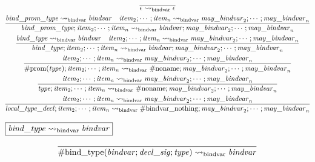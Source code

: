 \begin{gather*}
    \infer{\epsilon \rightsquigarrow_\mathrm{bindvar} \epsilon}{}
    \\
    \infer{\mathit{bind\_prom\_type}; \mathit{item}_2; \cdots; \mathit{item}_n \rightsquigarrow_\mathrm{bindvar} \mathit{bindvar}; \mathit{may\_bindvar}_2; \cdots; \mathit{may\_bindvar}_n}{
        \mathit{bind\_prom\_type} \rightsquigarrow_\mathrm{bindvar} \mathit{bindvar}
        &
        \mathit{item}_2; \cdots; \mathit{item}_n \rightsquigarrow_\mathrm{bindvar} \mathit{may\_bindvar}_2; \cdots; \mathit{may\_bindvar}_n
    }
    \\
    \infer{\mathit{bind\_type}; \mathit{item}_2; \cdots; \mathit{item}_n \rightsquigarrow_\mathrm{bindvar} \mathit{bindvar}; \mathit{may\_bindvar}_2; \cdots; \mathit{may\_bindvar}_n}{
        \mathit{bind\_type} \rightsquigarrow_\mathrm{bindvar} \mathit{bindvar}
        &
        \mathit{item}_2; \cdots; \mathit{item}_n \rightsquigarrow_\mathrm{bindvar} \mathit{may\_bindvar}_2; \cdots; \mathit{may\_bindvar}_n
    }
    \\
    \infer{\mathrm{\#prom}(\mathit{type}); \mathit{item}_2; \cdots; \mathit{item}_n \rightsquigarrow_\mathrm{bindvar} \mathrm{\#noname}; \mathit{may\_bindvar}_2; \cdots; \mathit{may\_bindvar}_n}{
        \mathit{item}_2; \cdots; \mathit{item}_n \rightsquigarrow_\mathrm{bindvar} \mathit{may\_bindvar}_2; \cdots; \mathit{may\_bindvar}_n
    }
    \\
    \infer{\mathit{type}; \mathit{item}_2; \cdots; \mathit{item}_n \rightsquigarrow_\mathrm{bindvar} \mathrm{\#noname}; \mathit{may\_bindvar}_2; \cdots; \mathit{may\_bindvar}_n}{
        \mathit{item}_2; \cdots; \mathit{item}_n \rightsquigarrow_\mathrm{bindvar} \mathit{may\_bindvar}_2; \cdots; \mathit{may\_bindvar}_n
    }
    \\
    \infer{\mathit{local\_type\_decl}; \mathit{item}_2; \cdots; \mathit{item}_n \rightsquigarrow_\mathrm{bindvar} \mathrm{\#bindvar\_nothing}; \mathit{may\_bindvar}_2; \cdots; \mathit{may\_bindvar}_n}{
        \mathit{item}_2; \cdots; \mathit{item}_n \rightsquigarrow_\mathrm{bindvar} \mathit{may\_bindvar}_2; \cdots; \mathit{may\_bindvar}_n
    }
\end{gather*}

$\fbox{$\mathit{bind\_type} \rightsquigarrow_\mathrm{bindvar} \mathit{bindvar}$}$

\begin{gather*}
    \infer{\mathrm{\#bind\_type}(\mathit{bindvar}; \mathit{decl\_sig}; \mathit{type}) \rightsquigarrow_\mathrm{bindvar} \mathit{bindvar}}{}
\end{gather*}


